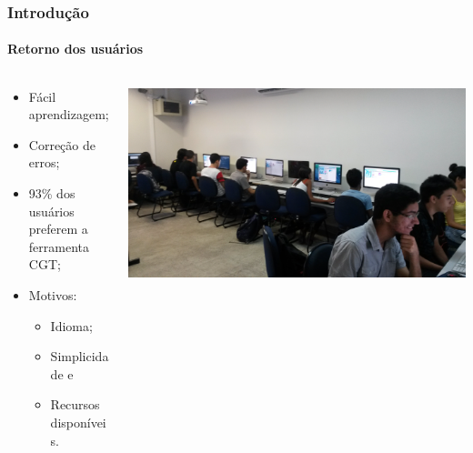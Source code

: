 \documentclass{beamer}
\begin{document}
   \begin{frame}
      \frametitle{Introdução}
      \framesubtitle{Retorno dos usuários}
      \begin{columns}[T]
         \begin{column}{0.48\textwidth}
            \begin{itemize}
               \item Fácil aprendizagem;
               \item Correção de erros;
               \item 93\% dos usuários preferem a ferramenta CGT;
               \item Motivos:
                  \begin{itemize}
                     \item Idioma;
                     \item Simplicidade e
                     \item Recursos disponíveis.
                  \end{itemize}
            \end{itemize}
         \end{column}
         \begin{column}{0.48\textwidth}
            \includegraphics[width=\textwidth]{images/ext/20150902_110944.jpg}
         \end{column}
      \end{columns}
   \end{frame}
\end{document}
